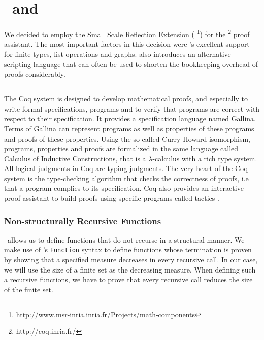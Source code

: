 \chapter{\coq\ and \ssreflect}
\label{chap:coq}


We decided to employ the Small Scale Reflection Extension (\textbf{\ssreflect}%
\footnote{http://www.msr-inria.inria.fr/Projects/math-components})
for the \textbf{\coq}%
\footnote{http://coq.inria.fr/}
proof assistant. 
The most important factors in this decision were \ssreflect's excellent support for finite types, list operations and graphs. \ssreflect{} also introduces an alternative scripting language that can often be used to shorten the bookkeeping overhead of proofs considerably.

\section{\coq}

The Coq system is designed to develop mathematical proofs, and especially to write formal specifications, programs and to verify that programs are correct with respect to their specification. 
It provides a specification language named Gallina. 
Terms of Gallina can represent programs as well as properties of these programs and proofs of these properties. 
Using the so-called Curry-Howard isomorphism, programs, properties and proofs are formalized in the same language called Calculus of Inductive Constructions, that is a $\lambda$-calculus with a rich type system. 
All logical judgments in Coq are typing judgments. 
The very heart of the Coq system is the type-checking algorithm that checks the correctness of proofs, i.e that a program complies to its specification. 
Coq also provides an interactive proof assistant to build proofs using specific programs called tactics \cite{Coq:manual}.



\subsection{Non-structurally Recursive Functions}
\coq\ allows us to define functions that do not recurse in a structural manner.
We make use of \coq's \lstinline{Function} syntax to define functions whose termination is proven by 
showing that a specified measure decreases in every recursive call.
In our case, we will use the size of a finite set as the decreasing measure.
When defining such a recursive functions, we have to prove that every recursive call reduces the size of the finite set.


